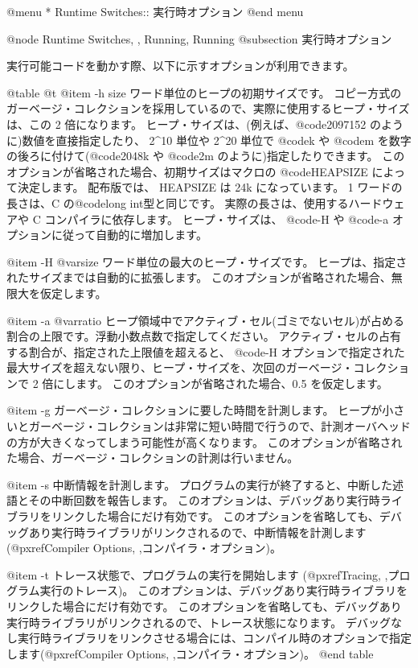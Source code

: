 {{{{@menu
* Runtime Switches::            実行時オプション
@end menu

@node Runtime Switches,  , Running, Running
@subsection 実行時オプション

実行可能コードを動かす際、以下に示すオプションが利用できます。

@table @t
@item -h size
ワード単位のヒープの初期サイズです。
コピー方式のガーベージ・コレクションを採用しているので、実際に使用するヒープ・サイズは、この 2 倍になります。
ヒープ・サイズは、(例えば、@code{2097152} のように)数値を直接指定したり、
 2^10 単位や 2^20 単位で @code{k} や @code{m} を数字の後ろに付けて(@code{2048k} や @code{2m} のように)指定したりできます。
このオプションが省略された場合、初期サイズはマクロの @code{HEAPSIZE} によって決定します。
配布版では、 HEAPSIZE は 24k になっています。
 1 ワードの長さは、C の@code{long int}型と同じです。
実際の長さは、使用するハードウェアや C コンパイラに依存します。
ヒープ・サイズは、 @code{-H} や @code{-a} オプションに従って自動的に増加します。

@item -H @var{size}
ワード単位の最大のヒープ・サイズです。
ヒープは、指定されたサイズまでは自動的に拡張します。
このオプションが省略された場合、無限大を仮定します。

@item -a @var{ratio}
ヒープ領域中でアクティブ・セル(ゴミでないセル)が占める割合の上限です。浮動小数点数で指定してください。
アクティブ・セルの占有する割合が、指定された上限値を超えると、 @code{-H} オプションで指定された最大サイズを超えない限り、ヒープ・サイズを、次回のガーベージ・コレクションで 2 倍にします。
このオプションが省略された場合、0.5 を仮定します。

@item -g
ガーベージ・コレクションに要した時間を計測します。
ヒープが小さいとガーベージ・コレクションは非常に短い時間で行うので、計測オーバヘッドの方が大きくなってしまう可能性が高くなります。
このオプションが省略された場合、ガーベージ・コレクションの計測は行いません。

@item -s
中断情報を計測します。
プログラムの実行が終了すると、中断した述語とその中断回数を報告します。
このオプションは、デバッグあり実行時ライブラリをリンクした場合にだけ有効です。
このオプションを省略しても、デバッグあり実行時ライブラリがリンクされるので、中断情報を計測します
(@pxref{Compiler Options, ,コンパイラ・オプション})。

@item -t
トレース状態で、プログラムの実行を開始します
(@pxref{Tracing, ,プログラム実行のトレース})。
このオプションは、デバッグあり実行時ライブラリをリンクした場合にだけ有効です。
このオプションを省略しても、デバッグあり実行時ライブラリがリンクされるので、トレース状態になります。
デバッグなし実行時ライブラリをリンクさせる場合には、コンパイル時のオプションで指定します(@pxref{Compiler Options, ,コンパイラ・オプション})。
@end table

}}}}
